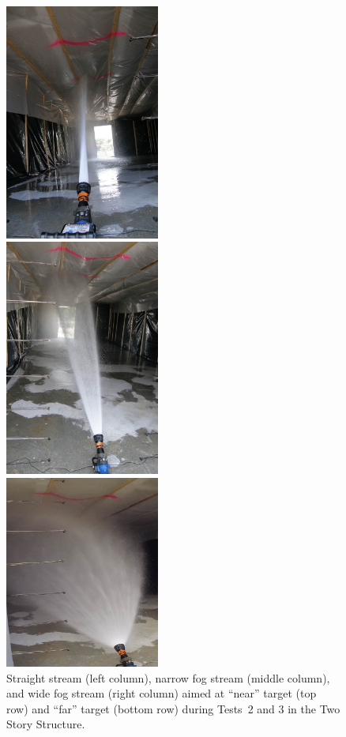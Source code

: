 \documentclass[12pt,oneside]{book}
\begin{document}
\begin{figure}[!ht]
\begin{center}
	\end{center}
	\endminipage \hfill
	\vspace{0.15in}
	\minipage{2.15in}
	\begin{center}
		\includegraphics[width=2in]{../Figures/Pictures/SS_far}
	\end{center} 
	\endminipage \hfill
	\minipage{2.15in}
	\begin{center}
		\includegraphics[width=2in]{../Figures/Pictures/NF_far}
	\end{center}
	\endminipage \hfill
	\minipage{2.15in}
	\begin{center}
		\includegraphics[width=2in]{../Figures/Pictures/WF_far}
	\end{center}
	\endminipage \hfill
	\caption[Straight stream, narrow fog stream, and wide fog stream aimed at the near and far targets in the Two Story Structure.]{Straight stream (left column), narrow fog stream (middle column), and wide fog stream (right column) aimed at ``near'' target (top row) and ``far'' target (bottom row) during Tests~2 and 3 in the Two Story Structure.}
	\label{fig:test_2_3_pic}
\end{figure}
\FloatBarrier
\end{document}
